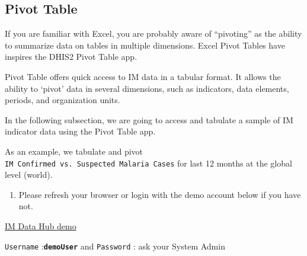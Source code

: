 \documentclass[]{book}
\providecommand{\tightlist}{%
  \setlength{\itemsep}{0pt}\setlength{\parskip}{0pt}}
\begin{document}
\hypertarget{pivot}{%
\subsection{Pivot Table}\label{pivot}}

If you are familiar with Excel, you are probably aware of ``pivoting'' as the ability to summarize data on tables in multiple dimensions. Excel Pivot Tables have inspires the DHIS2 Pivot Table app.

Pivot Table offers quick access to IM data in a tabular format. It allows the ability to `pivot' data in several dimensions, such as indicators, data elements, periods, and organization units.

In the following subsection, we are going to access and tabulate a sample of IM indicator data using the Pivot Table app.

As an example, we tabulate and pivot \texttt{IM\ Confirmed\ vs.\ Suspected\ Malaria\ Cases} for last 12 months at the global level (world).

\begin{enumerate}
\def\labelenumi{\arabic{enumi}.}
\tightlist
\item
  Please refresh your browser or login with the demo account below if you have not.
\end{enumerate}

\href{https://imdatahub.org}{IM Data Hub demo}

\texttt{Username} :\textbf{\texttt{demoUser}} and \texttt{Password} : ask your System Admin
\end{document}
